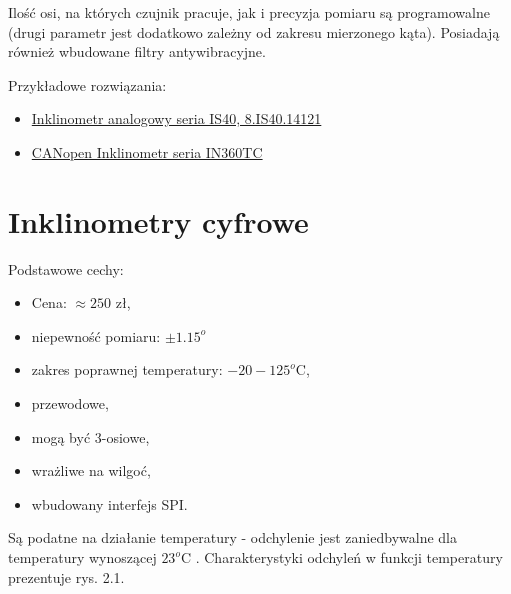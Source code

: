 Ilość osi, na których czujnik pracuje, jak i precyzja pomiaru są programowalne (drugi parametr jest dodatkowo zależny od zakresu mierzonego kąta). Posiadają również wbudowane filtry antywibracyjne.

Przykładowe rozwiązania:
\begin{itemize}
    \item \href{https://abcelektro.pl/inklinometr-analogowy-seria-is40-8.is40.14121-id-k8-is40-14121-000}{Inklinometr analogowy seria IS40, 8.IS40.14121}
    \item \href{https://sklep.pf-electronic.pl/pl/IN360TC-C2}{CANopen Inklinometr seria IN360TC}
\end{itemize}

\newpage

\section{Inklinometry cyfrowe}

Podstawowe cechy:
\begin{itemize}
    \item Cena: $\approx 250$ zł,
    \item niepewność pomiaru: $\pm 1.15^{o}$
    \item zakres poprawnej temperatury: $-20-125^{o}$C,
    \item przewodowe,
    \item mogą być 3-osiowe,
    \item wrażliwe na wilgoć,
    \item wbudowany interfejs SPI.
\end{itemize}

Są podatne na działanie temperatury - odchylenie jest zaniedbywalne dla temperatury wynoszącej $23^{o}$C \cite{inclino}. Charakterystyki odchyleń w funkcji temperatury prezentuje rys. 2.1.

